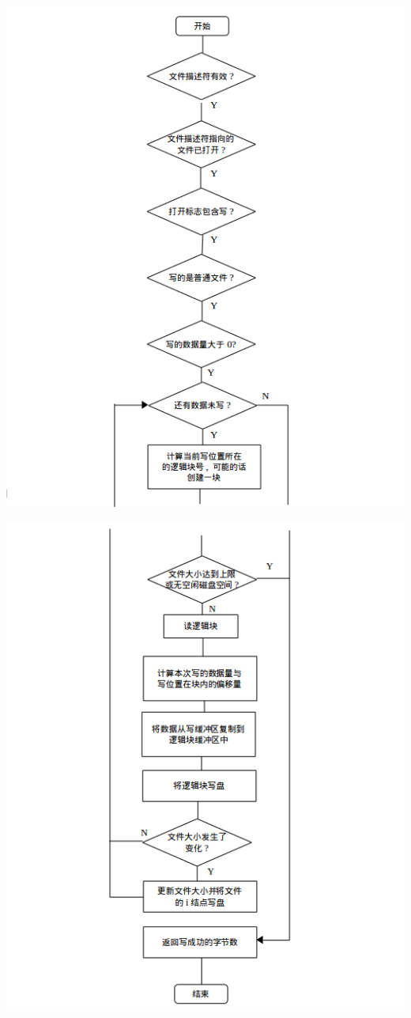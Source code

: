 \documentclass[nofonts, titlepage]{ctexart}
\begin{document}
\begin{itemize}
  \includegraphics[width=15cm]{./images/./write_1.png}

  \includegraphics[width=15cm]{./images/./write_2.png}
  \end{itemize}
\end{document}
